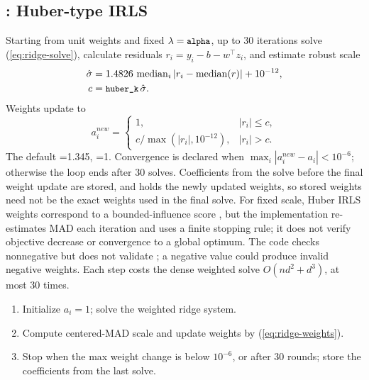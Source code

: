 \documentclass[conference]{IEEEtran}
\begin{document}
\subsection{: Huber-type IRLS}
Starting from unit weights and fixed \(\lambda=\texttt{\small alpha}\), up to 30 iterations solve (\ref{eq:ridge-solve}), calculate residuals \(r_i=y_i-b-w^\top z_i\), and estimate robust scale
\begin{equation}
\begin{split}
\hat\sigma&=1.4826\,\operatorname{median}_i|r_i-\operatorname{median}(r)|+10^{-12},\\
c&=\texttt{\small huber\_k}\,\hat\sigma.
\end{split}
\end{equation}
Weights update to
\begin{equation}
a_i^{new}=\begin{cases}1,&|r_i|\leq c,\\ c/\max(|r_i|,10^{-12}),&|r_i|>c.\end{cases}
\label{eq:ridge-weights}
\end{equation}
The default =1.345, =1. Convergence is declared when \(\max_i|a_i^{new}-a_i|<10^{-6}\); otherwise the loop ends after 30 solves. Coefficients from the solve before the final weight update are stored, and  holds the newly updated weights, so stored weights need not be the exact weights used in the final solve. For fixed scale, Huber IRLS weights correspond to a bounded-influence score \cite{huber1981}, but the implementation re-estimates MAD each iteration and uses a finite stopping rule; it does not verify objective decrease or convergence to a global optimum. The code checks nonnegative  but does not validate ; a negative value could produce invalid negative weights. Each step costs the dense weighted solve \(O(nd^2+d^3)\), at most 30 times.
\begin{enumerate}
\item Initialize \(a_i=1\); solve the weighted ridge system.
\item Compute centered-MAD scale and update weights by (\ref{eq:ridge-weights}).
\item Stop when the max weight change is below \(10^{-6}\), or after 30 rounds; store the coefficients from the last solve.
\end{enumerate}
\end{document}
